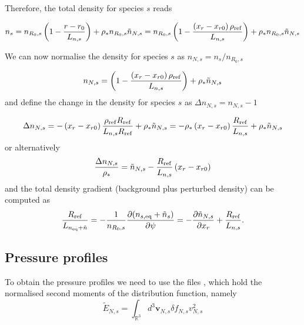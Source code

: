 Therefore, the total density for species $s$ reads

\begin{equation}
n_s = n_{R_0,s}\left(1-{r-r_0\over L_{n,s}}\right) + \rho_*n_{R_0,s}\tilde{n}_{N,s} = n_{R_0,s}\left(1 - {\left(x_r-x_{r0}\right)\rho_{\rm ref}\over {L_{n,s}}}\right) + \rho_*n_{R_0,s}\tilde{n}_{N,s}
\end{equation}

We can now normalise the density for species $s$ as $n_{N,s} = n_s / n_{R_0,s}$

\begin{equation}
n_{N,s} = \left(1 - {\left(x_r-x_{r0}\right)\rho_{\rm ref}\over {L_{n,s}}}\right) + \rho_*\tilde{n}_{N,s}
\end{equation}
and define the change in the density for species $s$ as $\Delta n_{N,s} = n_{N,s} - 1$

\begin{equation}
 \Delta n_{N,s} = - \left(x_r-x_{r0}\right){\rho_{\rm ref}R_{\rm ref}\over {L_{n,s}R_{\rm ref}}} + \rho_*\tilde{n}_{N,s}  =  - \rho_* \left(x_r-x_{r0}\right) {R_{\rm ref}\over L_{n,s}} + \rho_*\tilde{n}_{N,s}
\end{equation}
or alternatively
\begin{equation}
{\Delta n_{N,s} \over \rho_*} = \tilde{n}_{N,s} - {R_{\rm ref} \over L_{n,s}} \left(x_r-x_{r0}\right)
\end{equation}
and the total density gradient (background plus perturbed density) can be computed as
\begin{equation}
{R_{\rm ref} \over L_{n_{\rm eq}+\tilde{n}}}  =  -{1 \over n_{R_0,s}} {\partial (n_{s,\rm eq}+\tilde{n}_s) \over \partial \psi} = 
 -{\partial \tilde{n}_{N,s} \over \partial x_r} + {R_{\rm ref} \over L_{n,s}}.
\end{equation}


\subsection{Pressure profiles}
To obtain the pressure profiles we need to use the files , which hold the normalised second moments of the distribution function, namely
\begin{equation}
\tilde E_{N,s} = \int_{\mathbb{R}^3}d^3\mathbf{v}_{N,s}\delta f_{N,s}v_{N,s}^2
\end{equation}

